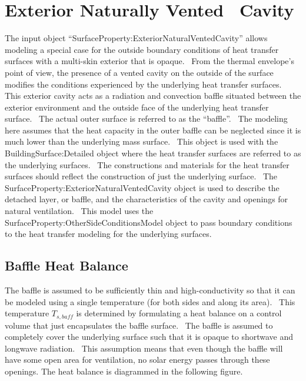 \section{Exterior Naturally Vented~ Cavity}\label{exterior-naturally-vented-cavity}

The input object ``SurfaceProperty:ExteriorNaturalVentedCavity'' allows modeling a special case for the outside boundary conditions of heat transfer surfaces with a multi-skin exterior that is opaque.~ From the thermal envelope's point of view, the presence of a vented cavity on the outside of the surface modifies the conditions experienced by the underlying heat transfer surfaces.~ This exterior cavity acts as a radiation and convection baffle situated between the exterior environment and the outside face of the underlying heat transfer surface.~ The actual outer surface is referred to as the ``baffle''.~ The modeling here assumes that the heat capacity in the outer baffle can be neglected since it is much lower than the underlying mass surface.~ This object is used with the BuildingSurface:Detailed object where the heat transfer surfaces are referred to as the underlying surfaces.~ The constructions and materials for the heat transfer surfaces should reflect the construction of just the underlying surface.~ The SurfaceProperty:ExteriorNaturalVentedCavity object is used to describe the detached layer, or baffle, and the characteristics of the cavity and openings for natural ventilation.~ This model uses the SurfaceProperty:OtherSideConditionsModel object to pass boundary conditions to the heat transfer modeling for the underlying surfaces.

\subsection{Baffle Heat Balance}\label{baffle-heat-balance}

The baffle is assumed to be sufficiently thin and high-conductivity so that it can be modeled using a single temperature (for both sides and along its area).~ This temperature \({T_{s,baff}}\) is determined by formulating a heat balance on a control volume that just encapsulates the baffle surface.~ The baffle is assumed to completely cover the underlying surface such that it is opaque to shortwave and longwave radiation.~ This assumption means that even though the baffle will have some open area for ventilation, no solar energy passes through these openings. The heat balance is diagrammed in the following figure.

